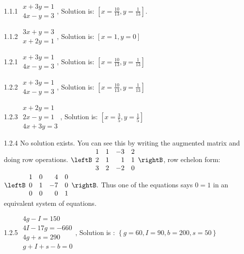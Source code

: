 \begin{Answer}{1.1.1}
$\begin{array}{c}
x+3y=1 \\
4x-y=3
\end{array}$, Solution is: $\left[ x=\frac{10}{13},y=\frac{1}{13}\right] $.
\end{Answer}
\begin{Answer}{1.1.2}
$\begin{array}{c}
3x+y=3 \\
x+2y=1
\end{array}
$, Solution is: $\left[ x=1,y=0\right] $
\end{Answer}
\begin{Answer}{1.2.1}
$\begin{array}{c}
x+3y=1 \\
4x-y=3
\end{array}
$, Solution is: $\left[ x=\frac{10}{13},y=\frac{1}{13}\right] $
\end{Answer}
\begin{Answer}{1.2.2}
$\begin{array}{c}
x+3y=1 \\
4x-y=3
\end{array}
$, Solution is: $\left[ x=\frac{10}{13},y=\frac{1}{13}\right] $
\end{Answer}
\begin{Answer}{1.2.3}
$\begin{array}{c}
x+2y=1 \\
2x-y=1 \\
4x+3y=3
\end{array}
$, Solution is: $\left[ x=\frac{3}{5},y=\frac{1}{5}\right] $
\end{Answer}
\begin{Answer}{1.2.4}
No solution exists. You can see this by writing the augmented
matrix and doing row operations. $\leftB
\begin{array}{rrrr}
1 & 1 & -3 & 2 \\
2 & 1 & 1 & 1 \\
3 & 2 & -2 & 0
\end{array}
\rightB $, row echelon form: $\leftB
\begin{array}{rrrr}
1 & 0 & 4 & 0 \\
0 & 1 & -7 & 0 \\
0 & 0 & 0 & 1
\end{array}
\rightB .$ Thus one of the equations says $0=1$ in an equivalent system of
equations.
\end{Answer}
\begin{Answer}{1.2.5}
$\begin{array}{c}
4g-I=150 \\
4I-17g=-660 \\
4g+s=290 \\
g+I+s-b=0
\end{array}
$, Solution is : $\left\{ g=60,I=90,b=200,s=50\right\} $
\end{Answer}
